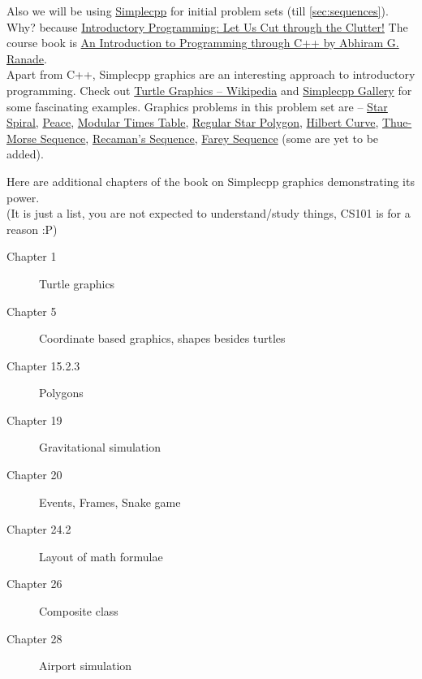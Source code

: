 Also we will be using \href{https://www.cse.iitb.ac.in/~ranade/simplecpp/}{Simplecpp} for initial problem sets (till \ref{sec:sequences}).
Why? because \href{https://www.cse.iitb.ac.in/~ranade/iticse16.pdf}{Introductory Programming: Let Us Cut through the Clutter!} The course book is \href{https://www.cse.iitb.ac.in/~ranade/book.html}{An Introduction to Programming through C++ by Abhiram G. Ranade}.\\
Apart from C++, Simplecpp graphics are an interesting approach to introductory programming. Check out \href{https://en.wikipedia.org/wiki/Turtle_graphics}{Turtle Graphics -- Wikipedia} and \href{https://www.cse.iitb.ac.in/~ranade/simplecpp/gallery.html}{Simplecpp Gallery} for some fascinating examples. Graphics problems in this problem set are -- \hyperref[pp:starspiral]{Star Spiral}, \hyperref[pp:peace]{Peace}, \hyperref[pp:timestable]{Modular Times Table}, \hyperref[pp:regularstarpolygon]{Regular Star Polygon}, \hyperref[pp:hilbertcurve]{Hilbert Curve}, \hyperref[pp:thuemorsesequence]{Thue-Morse Sequence}, \hyperref[pp:recamanssequence]{Recaman's Sequence}, \hyperref[pp:fareysequence]{Farey Sequence} (some are yet to be added).

Here are additional chapters of the book on Simplecpp graphics demonstrating its power.\\
(It is just a list, you are not expected to understand/study things, CS101 is for a reason :P)
\begin{description}
	\item[Chapter 1] Turtle graphics
	\item[Chapter 5] Coordinate based graphics, shapes besides turtles
	\item[Chapter 15.2.3] Polygons
	\item[Chapter 19] Gravitational simulation
	\item[Chapter 20] Events, Frames, Snake game
	\item[Chapter 24.2] Layout of math formulae
	\item[Chapter 26] Composite class
	\item[Chapter 28] Airport simulation
\end{description}
